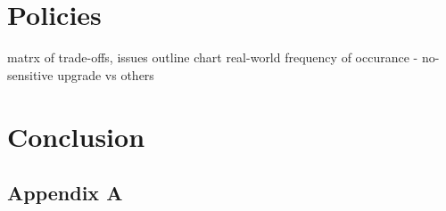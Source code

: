 \documentclass[12pt,fleqn]{ucithesis}
\begin{document}
\chapter{Policies}
  matrx of trade-offs, issues
  outline chart
  real-world frequency of occurance
  - no-sensitive upgrade vs others
\chapter{Conclusion}

\clearpage
{}




\appendix
\section{Appendix A}
\end{document}
